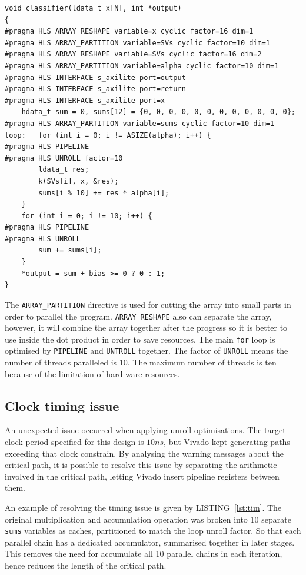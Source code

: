 \documentclass[journal]{IEEEtran}
\newcommand{\lref}[1]{LISTING~\ref{#1}}
\begin{document}
\begin{lstlisting}[caption={Optimised classifier top-level function},captionpos=b,label=lst:opt_cla]
void classifier(ldata_t x[N], int *output)
{
#pragma HLS ARRAY_RESHAPE variable=x cyclic factor=16 dim=1
#pragma HLS ARRAY_PARTITION variable=SVs cyclic factor=10 dim=1
#pragma HLS ARRAY_RESHAPE variable=SVs cyclic factor=16 dim=2
#pragma HLS ARRAY_PARTITION variable=alpha cyclic factor=10 dim=1
#pragma HLS INTERFACE s_axilite port=output
#pragma HLS INTERFACE s_axilite port=return
#pragma HLS INTERFACE s_axilite port=x
	hdata_t sum = 0, sums[12] = {0, 0, 0, 0, 0, 0, 0, 0, 0, 0, 0, 0};
#pragma HLS ARRAY_PARTITION variable=sums cyclic factor=10 dim=1
loop:	for (int i = 0; i != ASIZE(alpha); i++) {
#pragma HLS PIPELINE
#pragma HLS UNROLL factor=10
		ldata_t res;
		k(SVs[i], x, &res);
		sums[i % 10] += res * alpha[i];
	}
	for (int i = 0; i != 10; i++) {
#pragma HLS PIPELINE
#pragma HLS UNROLL
		sum += sums[i];
	}
	*output = sum + bias >= 0 ? 0 : 1;
}
\end{lstlisting}

The \texttt{ARRAY\_PARTITION} directive is used for cutting the array into small parts in order to parallel the program. \texttt{ARRAY\_RESHAPE} also can separate the array, however, it will combine the array together after the progress so it is better to use inside the dot product in order to save resources. The main \texttt{for} loop is optimised by \texttt{PIPELINE} and \texttt{UNTROLL} together. The factor of \texttt{UNROLL} means the number of threads paralleled is 10. The maximum number of threads is ten because of the limitation of hard ware resources. 

\subsection{Clock timing issue}

An unexpected issue occurred when applying unroll optimisations. The target clock period specified for this design is $10 ns$, but Vivado kept generating paths exceeding that clock constrain. By analysing the warning messages about the critical path, it is possible to resolve this issue by separating the arithmetic involved in the critical path, letting Vivado insert pipeline registers between them.

An example of resolving the timing issue is given by \lref{lst:tim}. The original multiplication and accumulation operation was broken into 10 separate \texttt{sums} variables as caches, partitioned to match the loop unroll factor. So that each parallel chain has a dedicated accumulator, summarised together in later stages. This removes the need for accumulate all 10 parallel chains in each iteration, hence reduces the length of the critical path.
\end{document}
